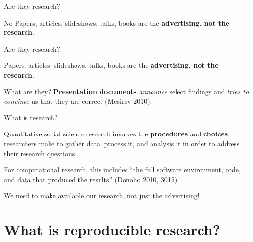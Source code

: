 \documentclass[10pt]{beamer}
\begin{document}
\begin{frame}{Are they research?}

    \begin{alertblock}{No}
        Papers, articles, slideshows, talks, books are the {\large{\textbf{advertising, not the research}}}.
    \end{alertblock}

\end{frame}


\begin{frame}{Are they research?}


    Papers, articles, slideshows, talks, books are the {\large{\textbf{advertising, not the research}}}.

    \vspace{1cm}

    \begin{block}{What are they?}
        \textbf{Presentation documents} \emph{announce} select findings and \emph{tries to convince} us that they are correct (Mesirov 2010).
    \end{block}
\end{frame}

\begin{frame}{What is research?}

    Quantitative social science research involves the \textbf{procedures} and \textbf{choices} researchers make to gather data, process it, and analysis it in order to address their research questions.

    \vspace{1cm}

    For {\large{computational research}}, this includes ``the {\large{full software environment, code, and data}} that produced the results'' (Donoho 2010, 3015).

\end{frame}

\begin{frame}
    \begin{center}
        {\large{We need to make available our research, not just the advertising!}}
    \end{center}
\end{frame}


\section{What is reproducible research?}
\end{document}
